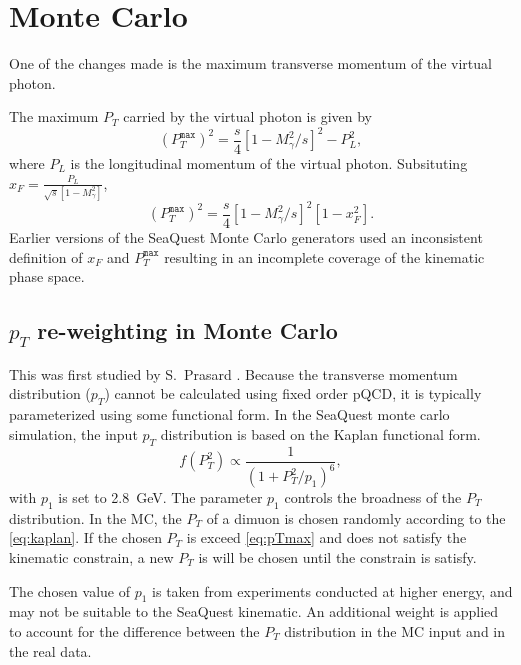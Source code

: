 \documentclass[../main.tex]{subfiles}
\begin{document}
\section{Monte Carlo}
\label{sec:MC}

One of the changes made is the maximum transverse momentum of the virtual photon.

The maximum $P_T$ carried by the virtual photon is given by
\begin{equation}
	\left(P_T^{\mathtt{max}}\right)^2 = \frac{s}{4} \left[1-M^2_\gamma/s\right]^2 - P_L^2,
\end{equation}
where $P_L$ is the longitudinal momentum of the virtual photon.
Subsituting $x_F = \frac{P_L}{\sqrt{s}\left[1-M^2_\gamma\right]}$,
\begin{equation}
	\left(P_T^{\mathtt{max}}\right)^2 = \frac{s}{4} \left[1-M^2_\gamma/s\right]^2\left[1-x_F^2\right].
	\label{eq:pTmax}
\end{equation}
Earlier versions of the SeaQuest Monte Carlo generators used an inconsistent definition of $x_F$
and $P_T^{\mathtt{max}}$ resulting in an incomplete coverage of the kinematic phase space.

\subsection{\texorpdfstring{$p_T$}{pT} re-weighting in Monte Carlo}
This was first studied by S.~Prasard \cite{prasad2020}.
Because the transverse momentum distribution ($p_T$) cannot be calculated using
fixed order pQCD, it is typically parameterized using some functional form.
In the SeaQuest monte carlo simulation, the input $p_T$ distribution is based on the
Kaplan functional form.
\begin{equation}
	f\left(P_T^2\right) \propto \frac{1}{\left(1+ P_T^2/p_1\right)^6},
	\label{eq:kaplan}
\end{equation}
with $p_1$ is set to \SI{2.8}{\GeV}. The parameter $p_1$ controls the broadness
of the $P_T$ distribution. In the MC, the $P_T$ of a dimuon is chosen randomly
according to the \cref{eq:kaplan}. If the chosen $P_T$ is exceed \cref{eq:pTmax}
and does not satisfy the kinematic constrain, a new $P_T$ is will be chosen until
the constrain is satisfy.

The chosen value of $p_1$ is taken from experiments conducted at higher
energy, and may not be suitable to the SeaQuest kinematic. An additional weight is
applied to account for the difference between the $P_T$ distribution in the MC input
and in the real data.
\end{document}
